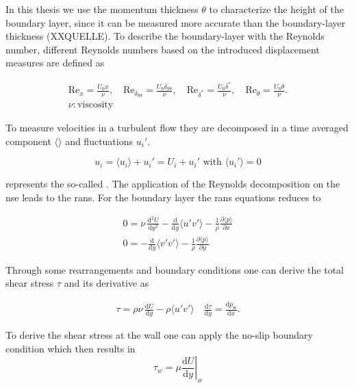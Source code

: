 In this thesis we use the momentum thickness $\theta$ to characterize the height of the boundary layer, since it can be measured more accurate than the boundary-layer thickness (XXQUELLE). 
To describe the boundary-layer with the Reynolds number, different Reynolds numbers based on the introduced displacement measures are defined as

\begin{gather}
    \mathrm{Re}_x = \frac{U_0 x}{\nu}, \quad
    \mathrm{Re}_{\delta_{99}} = \frac{U_0 \delta_{99}}{\nu}, \quad
    \mathrm{Re}_{\delta^*} = \frac{U_0 \delta^*}{\nu}, \quad
    \mathrm{Re}_\theta = \frac{U_0 \theta}{\nu}. \\
    \nu : \text{viscosity} \nonumber
\end{gather}

To measure velocities in a turbulent flow they are decomposed in a time averaged component $\langle \rangle$ and fluctuations $u_i'$. 

\begin{equation}
    u_i = \langle u_i \rangle + u_i' = U_i + u_i' \text{ with } \langle u_i'
\rangle = 0\end{equation}

represents the so-called .
The application of the Reynolds decomposition on the \acrshort{nse} leads to the \acrfull{rans}. 
For the boundary layer the \acrshort{rans} equations reduces to 

\begin{gather}
    0 = \nu\,\frac{\mathrm{d}^2 U}{\mathrm{d}y^2} - \frac{\mathrm{d}}{\mathrm{d}y}\langle u'v'\rangle - \frac{1}{\rho}\frac{\partial \langle p\rangle}{\partial x} \\
    0 = -\frac{\mathrm{d}}{\mathrm{d}y}\langle v'v'\rangle - \frac{1}{\rho}\frac{\partial \langle p\rangle}{\partial y} 
\end{gather}

Through some rearrangements and boundary conditions one can derive the total shear stress $\tau$ and its derivative as

\begin{gather}
    \tau = \rho\nu\,\frac{\mathrm{d} U}{\mathrm{d}y} - \rho\langle u'v'\rangle \quad
    \frac{\mathrm{d}\tau}{\mathrm{d}y} = \frac{\mathrm{d}p_{\mathrm{w}}}{\mathrm{d}x}.
\end{gather}

To derive the shear stress at the wall one can apply the no-slip boundary condition which then results in
\begin{equation}
    \tau_w = \mu \left. \frac{\mathrm{d}U}{\mathrm{d}y} \right|_w 
\end{equation}

